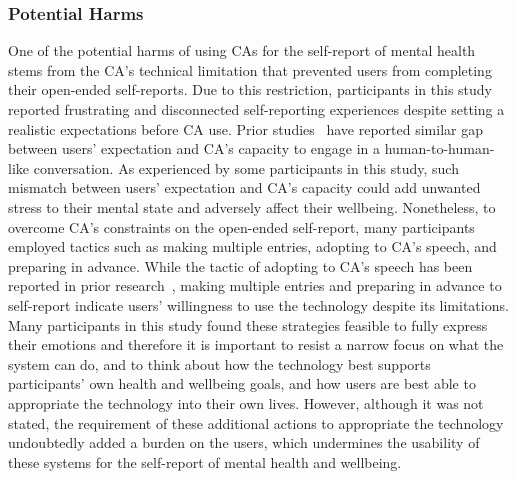         \subsubsection{Potential Harms}
        One of the potential harms of using \ac{CA}s for the self-report of mental health stems from the \ac{CA}'s technical limitation that prevented users from completing their open-ended self-reports. Due to this restriction, participants in this study reported frustrating and disconnected self-reporting experiences despite setting a realistic expectations before \ac{CA} use. Prior studies~\cite{Gulfbetwee2016ewa, onceakind2019minji} have reported similar gap between users' expectation and \ac{CA}'s capacity to engage in a human-to-human-like conversation. As experienced by some participants in this study, such mismatch between users' expectation and \ac{CA}'s capacity could add unwanted stress to their mental state and adversely affect their wellbeing. 
        Nonetheless, to overcome \ac{CA}'s constraints on the open-ended self-report, many participants employed tactics such as making multiple entries, adopting to \ac{CA}'s speech, and preparing in advance. While the tactic of adopting to \ac{CA}'s speech has been reported in prior research~\cite{myers2018patterns}, making multiple entries and preparing in advance to self-report indicate users' willingness to use the technology despite its limitations. Many participants in this study found these strategies feasible to fully express their emotions and therefore it is important to resist a narrow focus on what the system can do, and to think about how the technology best supports participants' own health and wellbeing goals, and how users are best able to appropriate the technology into their own lives. However, although it was not stated, the requirement of these additional actions to appropriate the technology undoubtedly added a burden on the users, which undermines the usability of these systems for the self-report of mental health and wellbeing.
        
